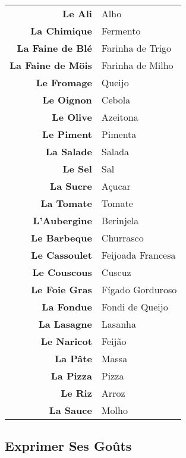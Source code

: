\documentclass{article}
\begin{document}
\begin{center}
\begin{tabular}{r l}
                \textbf{Le Ali}           & Alho\\ 
                \textbf{La Chimique}      & Fermento\\ 
                \textbf{La Faine de Blé}  & Farinha de Trigo\\ 
                \textbf{La Faine de Möis} & Farinha de Milho\\ 
                \textbf{Le Fromage}       & Queijo\\ 
                \textbf{Le Oignon}        & Cebola\\ 
                \textbf{Le Olive}         & Azeitona\\ 
                \textbf{Le Piment}        & Pimenta\\
                \textbf{La Salade}        & Salada\\
                \textbf{Le Sel}           & Sal\\ 
                \textbf{La Sucre}         & Açucar\\ 
                \textbf{La Tomate}        & Tomate\\[2.5ex] 

                \textbf{L'Aubergine}  & Berinjela\\
                \textbf{Le Barbeque}  & Churrasco\\
                \textbf{Le Cassoulet} & Feijoada Francesa\\
                \textbf{Le Couscous}  & Cuscuz\\
                \textbf{Le Foie Gras} & Fígado Gorduroso\\
                \textbf{La Fondue}    & Fondi de Queijo\\
                \textbf{La Lasagne}   & Lasanha\\
                \textbf{Le Naricot}   & Feijão\\
                \textbf{La Pâte}      & Massa\\
                \textbf{La Pizza}     & Pizza\\
                \textbf{Le Riz}       & Arroz\\
                \textbf{La Sauce}     & Molho\\
            \end{tabular}
        \end{center}

    \subsection{Exprimer Ses Goûts}
\end{document}
